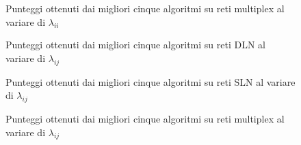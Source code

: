 \begin{figure}
    \centering
    \resizebox{\textwidth}{!}{}
    
    \caption{Punteggi ottenuti dai migliori cinque algoritmi su reti multiplex al variare di $\lambda_{ii}$}
    \label{chart:muxii}
\end{figure}




\begin{figure}
    
    \centering
    \resizebox{\textwidth}{!}{}
    
    \caption{Punteggi ottenuti dai migliori cinque algoritmi su reti DLN al variare di $\lambda_{ij}$}
    \label{chart:dlnij}
\end{figure}


\begin{figure}
    
    \centering
    \resizebox{\textwidth}{!}{}
    
    \caption{Punteggi ottenuti dai migliori cinque algoritmi su reti SLN al variare di $\lambda_{ij}$}
    \label{chart:slnij}
\end{figure}

\begin{figure}
    
    \centering
    \resizebox{\textwidth}{!}{}

    \caption{Punteggi ottenuti dai migliori cinque algoritmi su reti multiplex al variare di $\lambda_{ij}$}
    \label{chart:muxij}
\end{figure}